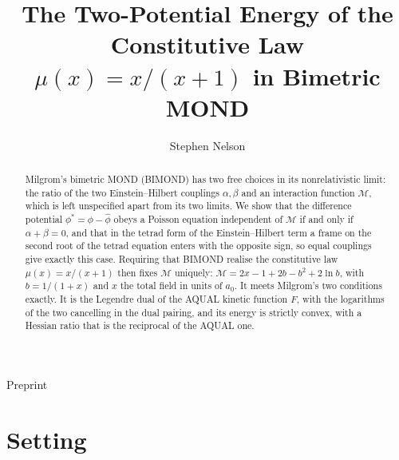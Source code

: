 \documentclass[twocolumn]{iopjournal}
\renewcommand{\articletype}[1]{%
  {\vspace*{-8mm}\noindent \Large \sf Preprint}\par
  \vspace*{6mm}\noindent{\scriptsize \sf{\bfseries \MakeUppercase{#1}}}}
\begin{document}
\articletype{Supplementary Material}

\title{The Two-Potential Energy of the Constitutive Law\\
$\mu(x) = x/(x+1)$ in Bimetric MOND}

\author{Stephen Nelson}



\begin{abstract}
Milgrom's bimetric MOND (BIMOND) has two free choices in its
nonrelativistic limit: the ratio of the two Einstein--Hilbert
couplings $\alpha,\beta$ and an interaction function $\mathcal{M}$,
which is left unspecified apart from its two limits. We show that
the difference potential $\phi^* = \phi - \hat\phi$ obeys a Poisson
equation independent of $\mathcal{M}$ if and only if
$\alpha + \beta = 0$, and that in the tetrad form of the
Einstein--Hilbert term a frame on the second root of the tetrad
equation enters with the opposite sign, so equal couplings give
exactly this case. Requiring that BIMOND realise the constitutive
law $\mu(x) = x/(x+1)$ then fixes $\mathcal{M}$ uniquely:
$\mathcal{M} = 2x - 1 + 2b - b^2 + 2\ln b$, with
$b = 1/(1+x)$ and $x$ the total field in units of $a_0$. It meets
Milgrom's two conditions exactly. It is the Legendre dual of the
AQUAL kinetic function $F$, with the logarithms of the two cancelling
in the dual pairing, and its energy is strictly convex, with a
Hessian ratio that is the reciprocal of the AQUAL one.
\end{abstract}



\section*{Setting}
\end{document}
